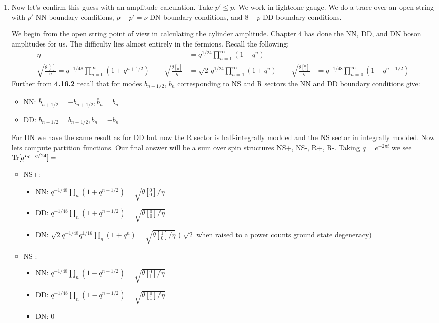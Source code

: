 \documentclass[11pt, class=article, crop=false]{standalone}
\begin{document}
\begin{enumerate}
	From this I posit that the static force between two branes vanishes precisely when $\nu = 0 \text{ mod } 4$.
	
	\item Now let's confirm this guess with an amplitude calculation. Take $p' \leq p$. We work in lightcone gauge. We do a trace over an open string with $p'$ NN boundary conditions, $p-p' = \nu$ DN boundary conditions, and $8-p$ DD boundary conditions. 
	
	We begin from the open string point of view in calculating the cylinder amplitude. Chapter 4 has done the NN, DD, and DN boson amplitudes for us. The difficulty lies almost entirely in the fermions.
	Recall the following:
	\[
	\begin{aligned}
		\eta &= q^{1/24} \prod_{n=1}^\infty (1-q^n)\\
		 \sqrt{\frac{\theta[{^0_0}]}{\eta}} = q^{-1/48} \prod_{n=0}^\infty (1 + q^{n+1/2}) \qquad 
		 \sqrt{\frac{\theta[{^1_0}]}{\eta}} &= \sqrt 2 \, q^{1/24} \prod_{n=1}^\infty (1 + q^n) \qquad  \sqrt{\frac{\theta[{^0_1}]}{\eta}} &= q^{-1/48} \prod_{n=0}^\infty (1 - q^{n+1/2})
	\end{aligned}
	\]
	Further from \textbf{4.16.2} recall that for modes $b_{n+1/2}$, $b_n$ corresponding to NS and R sectors  the NN and DD boundary conditions give:
	\begin{itemize}
		\item NN: $\bar b_{n+1/2} = - b_{n+1/2}, \bar b_n = b_n$
		\item DD: $\bar b_{n+1/2} = b_{n+1/2}, \bar b_n = -b_n$
	\end{itemize}
	For DN we have the same result as for DD but now the R sector is half-integrally modded and the NS sector in integrally modded. Now lets compute partition functions. Our final answer will be a sum over spin structures NS+, NS-, R+, R-. Taking $q = e^{- 2 \pi t}$ we see $\mathrm{Tr}[q^{L_0 - c/24}] = $
	\begin{itemize}
		\item NS+: 
		\begin{itemize}
			\item NN: $q^{-1/48}\prod_{n} (1 + q^{n+1/2}) =  \sqrt{\theta[{^0_0}]/\eta}$
			\item DD: $q^{-1/48}\prod_{n} (1 + q^{n+1/2}) = \sqrt{\theta[{^0_0}]/\eta}$
			\item DN: $\sqrt{2} q^{-1/48} q^{1/16} \prod_{n} (1 + q^{n}) = \sqrt{\theta[{^1_0}]/\eta}$ ( $\sqrt 2$ when raised to a power counts ground state degeneracy)
		\end{itemize}
%
		\item NS-: 
		\begin{itemize}
			\item NN: $q^{-1/48}\prod_{n} (1 - q^{n+1/2}) =  \sqrt{\theta[{^0_1}]/\eta}$
			\item DD: $q^{-1/48}\prod_{n} (1 - q^{n+1/2}) = \sqrt{\theta[{^0_1}]/\eta}$
			\item DN: $0$
		\end{itemize}
		

\end{itemize}
\end{enumerate}
\end{document}
